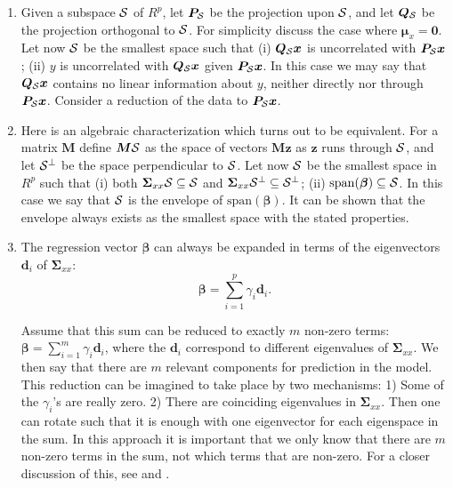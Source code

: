 \documentclass[num-refs]{wiley-article}
\begin{document}
\begin{enumerate}[label=\Alph*.]

\item Given a subspace $\cal{S}$ of $R^p$, let $\bm{P}_{\cal{S}}$ be the projection upon $\cal{S}$, and let $\bm{Q}_{\cal{S}}$ be the projection orthogonal to $\cal{S}$. For simplicity discuss the case where $\bm{\mu}_x =\bm{0}$. Let now $\cal{S}$ be the smallest space such that (i) $\bm{Q}_{\cal{S}}\bm{x}$ is uncorrelated with $\bm{P}_{\cal{S}}\bm{x}$; (ii) $y$ is uncorrelated with $\bm{Q}_{\cal{S}}\bm{x}$ given $\bm{P}_{\cal{S}}\bm{x}$. In this case we may say that $\bm{Q}_{\cal{S}}\bm{x}$ contains no linear information about $y$, neither directly nor through $\bm{P}_{\cal{S}}\bm{x}$. Consider a reduction of the data to $\bm{P}_{\cal{S}}\bm{x}$.
  \smallskip

\item  Here is an algebraic characterization which turns out to be equivalent. For a matrix $\bm{M}$ define $\bm{M}\cal{S}$ as the space of vectors $\bm{Mz}$ as $\bm{z}$ runs through $\cal{S}$, and let $\cal{S}^\perp$ be
  the space perpendicular to $\cal{S}$. Let now $\cal{S}$ be the smallest space in $R^p$ such that (i) both $\bm{\Sigma}_{xx}\cal{S}\subseteq\cal{S}$ and
  $\bm{\Sigma}_{xx}\cal{S}^\perp\subseteq\cal{S}^\perp$; (ii) $\mathrm{span}(\bm{\beta})\subseteq\cal{S}$. In this case we say that $\cal{S}$
  is the envelope of $\mathrm{span}(\bm{\beta})$. It can be shown \citep{cook2010envelope} that the envelope always exists as the smallest space with the stated properties.
  \smallskip

\item The regression vector $\bm{\beta}$ can always be expanded in terms of the eigenvectors $\bm{d}_{i}$ of $\bm{\Sigma}_{xx}$:
  \begin{equation}
    \bm{\beta}=\sum_{i=1}^p \gamma_{i}\bm{d}_{i}.
    \label{beta}
  \end{equation}

  Assume that this sum can be reduced to exactly $m$ non-zero terms:
  $\bm{\beta}=\sum_{i=1}^m \gamma_{i}\bm{d}_{i}$, where the $\bm{d}_i$ correspond to different eigenvalues of $\bm{\Sigma}_{xx}$. We then say that there are $m$ relevant components for prediction in the model. This reduction can be imagined to take place by two mechanisms: 1) Some of the $\gamma_i$'s are really zero. 2) There are coinciding eigenvalues in $\bm{\Sigma}_{xx}$. Then one can rotate such that it is enough with one eigenvector for each eigenspace in the sum. In this approach it is important that we only know that there are $m$ non-zero terms in the sum, not which  terms that are non-zero. For a closer discussion of this, see \citet{naes1993relevant} and \citet{helland1994comparison}.
  \smallskip


\end{enumerate}
\end{document}
